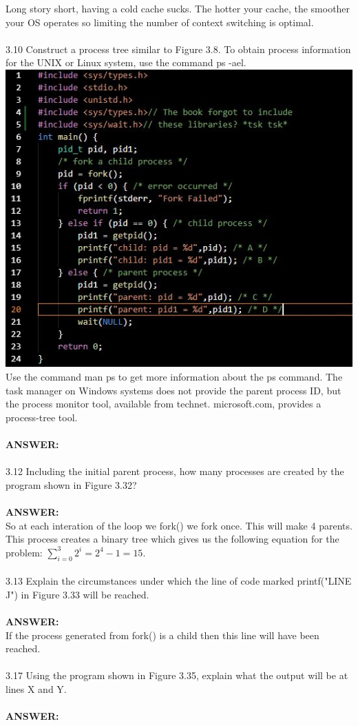 \documentclass[12pt]{article}
\begin{document}
\noindent Long story short, having a cold cache sucks. The hotter your cache, the smoother 
your OS operates so limiting the number of context switching is optimal.\\\\
3.10 Construct a process tree similar to Figure 3.8. To obtain process information
for the UNIX or Linux system, use the command ps -ael.\\
\includegraphics{code.jpg}\\
Use the command man ps to get more information about the ps command.
The task manager on Windows systems does not provide the
parent process ID, but the process monitor tool, available from technet.
microsoft.com, provides a process-tree tool.\\\\
\textbf{ANSWER: }\\\\
3.12 Including the initial parent process, how many processes are created by
the program shown in Figure 3.32?\\\\
\textbf{ANSWER: }\\
So at each interation of the loop we fork() we fork once. This will make 4
parents. This process creates a binary tree which gives us the following 
equation for the problem: $\sum_{i=0}^{3}{2^i}=2^4-1=15$. \\\\
3.13 Explain the circumstances under which the line of code marked
printf("LINE J") in Figure 3.33 will be reached.\\\\
\textbf{ANSWER: }\\
If the process generated from fork() is a child then this line will have been 
reached.\\\\
3.17 Using the program shown in Figure 3.35, explain what the output will
be at lines X and Y.\\\\
\textbf{ANSWER: }\\\\
\end{document}
